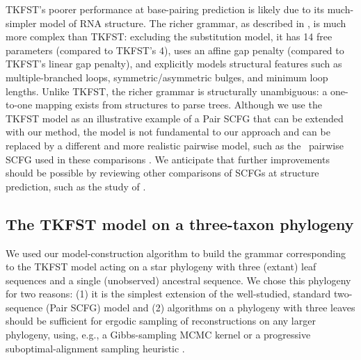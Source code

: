 \documentclass[10pt]{article}
\begin{document}
TKFST's poorer performance at base-pairing prediction is likely
due to its much-simpler model of RNA structure.
The richer grammar, as described in \cite{Holmes2005},
is much more complex than TKFST:
excluding the substitution model, it has 14 free parameters
(compared to TKFST's 4),
uses an affine gap penalty
(compared to TKFST's linear gap penalty),
and explicitly models structural features
such as multiple-branched loops, symmetric/asymmetric bulges, and minimum loop lengths.
Unlike TKFST, the richer grammar is structurally unambiguous:
a one-to-one mapping exists from structures to parse trees.
Although we use the TKFST model as an illustrative example of a Pair
SCFG that can be extended with our method, the model is not
fundamental to our approach and can be replaced by a different
and more realistic pairwise model, such as the \stemloc\ pairwise SCFG used in 
these comparisons \cite{BradleyPachterHolmes2008}.
We anticipate that further improvements should be possible by reviewing
other comparisons of SCFGs at structure prediction,
such as the study of \cite{DowellEddy2004}.


\subsection*{The TKFST model on a three-taxon phylogeny}

We used our model-construction algorithm to build the grammar
corresponding to the TKFST model acting on a star phylogeny with three
(extant) leaf sequences and a single (unobserved) ancestral
sequence. We chose this phylogeny for two reasons: (1) it is the
simplest extension of the well-studied, standard two-sequence (Pair
SCFG) model and (2) algorithms on a phylogeny with three leaves
should be sufficient for ergodic sampling of reconstructions on any larger phylogeny,
using, e.g., a Gibbs-sampling MCMC kernel \cite{JensenHein2002}
or a progressive suboptimal-alignment sampling heuristic \cite{PatenHolmesBirney2008}.
\end{document}

